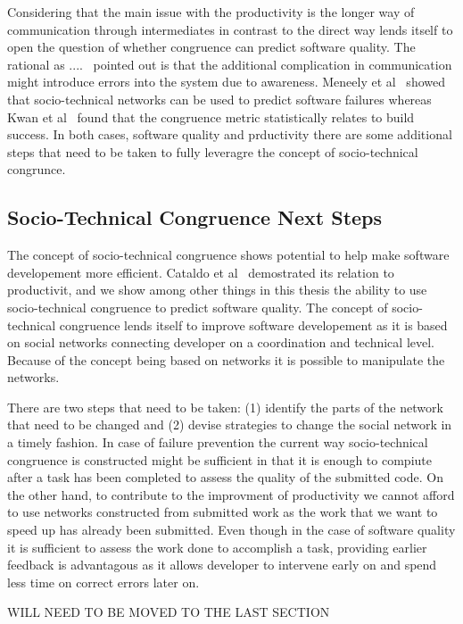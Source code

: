 Considering that the main issue with the productivity is the longer way of communication through intermediates in contrast to the direct way lends itself to open the question of whether congruence can predict software quality.
The rational as ....~\cite{} pointed out is that the additional complication in communication might introduce errors into the system due to awareness.
Meneely et al~\cite{} showed that socio-technical networks can be used to predict software failures whereas Kwan et al~\cite{} found that the congruence metric statistically relates to build success.
In both cases, software quality and prductivity there are some additional steps that need to be taken to fully leveragre the concept of socio-technical congrunce.

\subsection{Socio-Technical Congruence Next Steps}
The concept of socio-technical congruence shows potential to help make software developement more efficient.
Cataldo et al~\cite{cataldo:cscw:2006} demostrated its relation to productivit, and we show among other things in this thesis the ability to use socio-technical congruence to predict software quality.
The concept of socio-technical congruence lends itself to improve software developement as it is based on social networks connecting developer on a coordination and technical level.
Because of the concept being based on networks it is possible to manipulate the networks.

There are two steps that need to be taken:
(1) identify the parts of the network that need to be changed
and (2) devise strategies to change the social network in a timely fashion.
In case of failure prevention the current way socio-technical congruence is constructed might be sufficient in that it is enough to compiute after a task has been completed to assess the quality of the submitted code.
On the other hand, to contribute to the improvment of productivity we cannot afford to use networks constructed from submitted work as the work that we want to speed up has already been submitted.
Even though in the case of software quality it is sufficient to assess the work done to accomplish a task, providing earlier feedback is advantagous as it allows developer to intervene early on and spend less time on correct errors later on.

WILL NEED TO BE MOVED TO THE LAST SECTION

